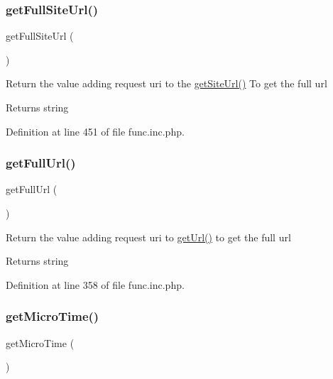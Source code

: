 \subsubsection{\texorpdfstring{get\+Full\+Site\+Url()}{getFullSiteUrl()}}
{\footnotesize\ttfamily get\+Full\+Site\+Url (\begin{DoxyParamCaption}{ }\end{DoxyParamCaption})}

Return the value adding request uri to the \hyperlink{func_8inc_8php_a2d80ea9652d1586d5dcd03d022150f73}{get\+Site\+Url()} To get the full url

\begin{DoxyReturn}{Returns}
string 
\end{DoxyReturn}


Definition at line 451 of file func.\+inc.\+php.

\mbox{\label{func_8inc_8php_acaf8f155dd27e065b7fb0f5c3f702027}} 
\subsubsection{\texorpdfstring{get\+Full\+Url()}{getFullUrl()}}
{\footnotesize\ttfamily get\+Full\+Url (\begin{DoxyParamCaption}{ }\end{DoxyParamCaption})}

Return the value adding request uri to \hyperlink{func_8inc_8php_accd14bda49a1044b4d8dd93f020f11ee}{get\+Url()} to get the full url

\begin{DoxyReturn}{Returns}
string 
\end{DoxyReturn}


Definition at line 358 of file func.\+inc.\+php.

\mbox{\label{func_8inc_8php_a83ff2cccfdfaf38ba29c8c6d04586deb}} 
\subsubsection{\texorpdfstring{get\+Micro\+Time()}{getMicroTime()}}
{\footnotesize\ttfamily get\+Micro\+Time (\begin{DoxyParamCaption}{ }\end{DoxyParamCaption})}

